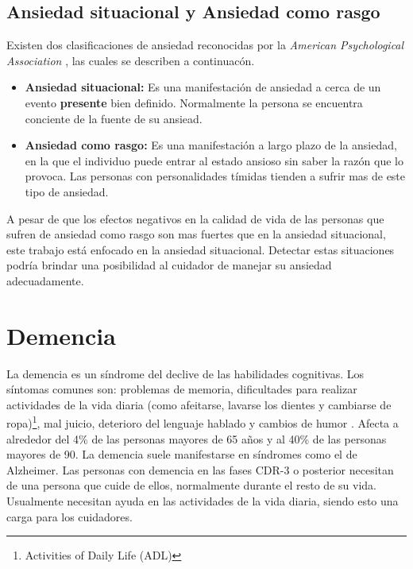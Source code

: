 \subsection{Ansiedad situacional y Ansiedad como rasgo}\label{secc:anxieystatevstrait}
Existen dos clasificaciones de ansiedad reconocidas por la \textit{American Psychological Association} \citep{psychologyapa} , las cuales se describen a continuac\'on.

\begin{itemize}
	\item{\textbf{Ansiedad situacional:}} Es una manifestaci\'on de ansiedad a cerca de un evento \textbf{presente} bien definido. Normalmente la persona se encuentra conciente de la fuente de su ansiead. 
	\item{\textbf{Ansiedad como rasgo:}} Es una manifestaci\'on a largo plazo de la ansiedad, en la que el individuo puede entrar al estado ansioso sin saber la raz\'on que lo provoca. Las personas con personalidades t\'imidas tienden a sufrir mas de este tipo de ansiedad.

\end{itemize}

A pesar de que los efectos negativos en la calidad de vida de las personas que sufren de ansiedad como rasgo son mas fuertes que en la ansiedad situacional, este trabajo est\'a enfocado en la ansiedad situacional. Detectar estas situaciones podr\'ia brindar una posibilidad al cuidador de manejar su ansiedad adecuadamente.
\section{Demencia}\label{secc:dementia}
La demencia es un s\'indrome del declive de las habilidades cognitivas. Los s\'intomas comunes son: problemas de memoria, dificultades para realizar actividades de la vida diaria (como afeitarse, lavarse los dientes y cambiarse de ropa)\footnote{Activities of Daily Life (ADL)}, mal juicio, deterioro del lenguaje hablado y cambios de humor \citep{Aziz}. Afecta a alrededor del 4\% de las personas mayores de 65 a\~nos y al 40\% de las personas mayores de 90. La demencia suele manifestarse en s\'indromes como el de Alzheimer. Las personas con demencia en las fases CDR-3 o posterior necesitan de una persona que cuide de ellos, normalmente durante el resto de su vida. Usualmente necesitan ayuda en las actividades de la vida diaria, siendo esto una carga para los cuidadores.

